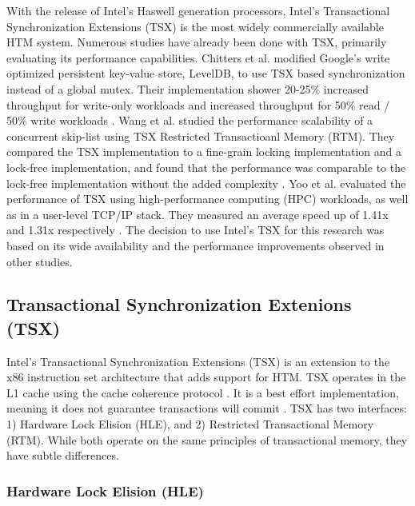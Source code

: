 \documentclass[a4paper]{article}
\begin{document}
\indent With the release of Intel's Haswell generation processors, Intel's
Transactional Synchronization Extensions (TSX) is the most widely commercially
available HTM system.  Numerous studies have already been done with TSX,
primarily evaluating its performance capabilities.  Chitters et al. modified
Google's write optimized persistent key-value store, LevelDB, to use TSX based
synchronization instead of a global mutex.  Their implementation shower 20-25\%
increased throughput for write-only workloads and increased throughput for 50\%
read / 50\% write workloads \cite{chitters_tsx}.  Wang et al. studied the
performance scalability of a concurrent skip-list using TSX Restricted
Transactioanl Memory (RTM).  They compared the TSX implementation to a
fine-grain locking implementation and a lock-free implementation, and found that
the performance was comparable to the lock-free implementation without the added
complexity \cite{wang_tsx}.  Yoo et al. evaluated the performance of TSX using
high-performance computing (HPC) workloads, as well as in a user-level TCP/IP
stack.  They measured an average speed up of 1.41x and 1.31x respectively
\cite{yoo_tsx}.  The decision to use Intel's TSX for this research was based on
its wide availability and the performance improvements observed in other
studies.\par

\subsection{\textbf{Transactional Synchronization Extenions (TSX)}}

\indent Intel's Transactional Synchronization Extensions (TSX) is an extension
to the x86 instruction set architecture that adds support for HTM.  TSX operates
in the L1 cache using the cache coherence protocol \cite{intel_opt_man}.  It is
a best effort implementation, meaning it does not guarantee transactions will
commit \cite{intel_prog_ref}.  TSX has two interfaces: 1) Hardware Lock Elision
(HLE), and 2) Restricted Transactional Memory (RTM).  While both operate on the
same principles of transactional memory, they have subtle differences.\par

\subsubsection{\textbf{Hardware Lock Elision (HLE)}}

\indent 
\end{document}
